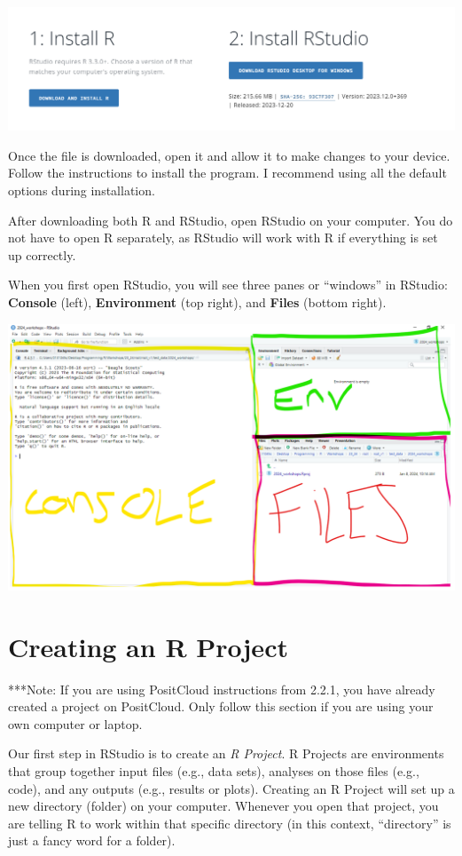 \documentclass[
]{book}
\begin{document}
\includegraphics{img/01-rstudiodownload.png}

Once the file is downloaded, open it and allow it to make changes to your device. Follow the instructions to install the program. I recommend using all the default options during installation.

After downloading both R and RStudio, open RStudio on your computer. You do not have to open R separately, as RStudio will work with R if everything is set up correctly.

When you first open RStudio, you will see three panes or ``windows'' in RStudio: \textbf{Console} (left), \textbf{Environment} (top right), and \textbf{Files} (bottom right).

\includegraphics{img/rstudio_first.png}

\section{Creating an R Project}\label{creating-an-r-project}

***Note: If you are using PositCloud instructions from 2.2.1, you have already created a project on PositCloud. Only follow this section if you are using your own computer or laptop.

Our first step in RStudio is to create an \emph{R Project}. R Projects are environments that group together input files (e.g., data sets), analyses on those files (e.g., code), and any outputs (e.g., results or plots). Creating an R Project will set up a new directory (folder) on your computer. Whenever you open that project, you are telling R to work within that specific directory (in this context, ``directory'' is just a fancy word for a folder).
\end{document}

